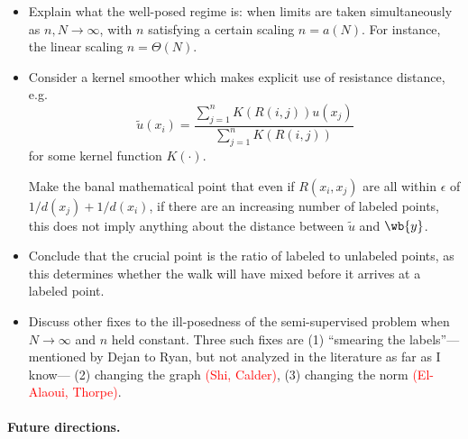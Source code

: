 \documentclass{article}
\newcommand{\1}{\mathbf{1}}
\newcommand{\wt}[1]{\widetilde{#1}}
\theoremstyle{definition}
\theoremstyle{remark}
\begin{document}
\begin{itemize}
	\item Explain what the well-posed regime is: when limits are taken simultaneously as $n,N \to \infty$, with $n$ satisfying a certain scaling $n = a(N)$. For instance, the linear scaling $n = \Theta(N)$. 
	\item Consider a kernel smoother which makes explicit use of resistance distance, e.g.
	\begin{equation*}
	\wt{u}(x_i) = \frac{\sum_{j = 1}^{n} K(R(i,j)) u(x_j)}{\sum_{j = 1}^{n} K(R(i,j))}
	\end{equation*}
	for some kernel function $K(\cdot)$.
	
	Make the banal mathematical point that even if $R(x_i,x_j)$ are all within $\epsilon$ of $1/d(x_j) + 1/d(x_i)$, if there are an increasing number of labeled points, this does not imply anything about the distance between $\wt{u}$ and $\wb{y}$.
	\item Conclude that the crucial point is the ratio of labeled to unlabeled points, as this determines whether the walk will have mixed before it arrives at a labeled point.
	\item Discuss other fixes to the ill-posedness of the semi-supervised problem when $N \to \infty$ and $n$ held constant. Three such fixes are (1) ``smearing the labels''---mentioned by Dejan to Ryan, but not analyzed in the literature as far as I know--- (2) changing the graph \textcolor{red}{(Shi, Calder)}, (3) changing the norm \textcolor{red}{(El-Alaoui, Thorpe)}.
\end{itemize}


\paragraph{Future directions.}
\end{document}
